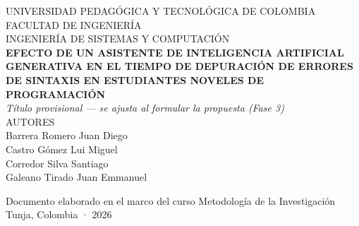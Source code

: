 \documentclass[12pt, letterpaper]{report}
\begin{document}
\begin{titlepage}
\centering
{}

{\MakeUppercase{Universidad Pedagógica y Tecnológica de Colombia}}\\[0.2cm]
{\MakeUppercase{Facultad de Ingeniería}}\\[0.2cm]
{\MakeUppercase{Ingeniería de Sistemas y Computación}}\\[2.5cm]

\textbf{\Large EFECTO DE UN ASISTENTE DE INTELIGENCIA ARTIFICIAL GENERATIVA EN EL TIEMPO DE DEPURACIÓN DE ERRORES DE SINTAXIS EN ESTUDIANTES NOVELES DE PROGRAMACIÓN}\\[0.5cm]
\textit{\small Título provisional — se ajusta al formular la propuesta (Fase 3)}\\[2.5cm]

\MakeUppercase{Autores}\\[0.4cm]
Barrera Romero Juan Diego\\[0.2cm]
Castro Gómez Lui Miguel\\[0.2cm]
Corredor Silva Santiago\\[0.2cm]
Galeano Tirado Juan Emmanuel

\vfill
Documento elaborado en el marco del curso Metodología de la Investigación\\[0.3cm]
Tunja, Colombia · 2026
\end{titlepage}

\newpage
\tableofcontents
\newpage
\listoftables
\newpage
\listoffigures
\newpage



 





 





\nocite{*}

\end{document}
